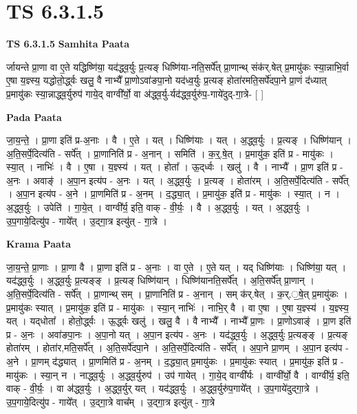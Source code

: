 \documentclass[17pt]{extarticle}
\begin{document}
\section{ TS 6.3.1.5 }

\textbf{TS 6.3.1.5 } \newline
\textbf{Samhita Paata} \newline

र्जायन्ते प्रा॒णा वा ए॒ते यद्धिष्णि॑या॒ यद॑द्ध्व॒र्युः प्र॒त्यङ् धिष्णि॑या-नति॒सर्पे᳚त् प्रा॒णान्थ् संक॑र्.षेत् प्र॒मायु॑कः स्या॒न्नाभि॒र्वा ए॒षा य॒ज्ञ्स्य॒ यद्धोतो॒र्द्ध्वः खलु॒ वै नाभ्यै᳚ प्रा॒णोऽवा॑ङपा॒नो यद॑ध्व॒र्युः प्र॒त्यङ् होता॑रमति॒सर्पे॑दपा॒ने प्रा॒णं द॑ध्यात् प्र॒मायु॑कः स्या॒न्नाद्ध्व॒र्युरुप॑ गाये॒द् वाग्वी᳚र्यो॒ वा अ॑द्ध्व॒र्यु-र्यद॑द्ध्व॒र्युरु॑प॒-गाये॑दुद्-गा॒त्रे- [  ] \newline

\textbf{Pada Paata} \newline

जा॒य॒न्ते॒ । प्रा॒णा इति॑ प्र-अ॒नाः । वै । ए॒ते । यत् । धिष्णि॑याः । यत् । अ॒द्ध्व॒र्युः । प्र॒त्यङ् । धिष्णि॑यान् । अ॒ति॒सर्पे॒दित्य॑ति - सर्पे᳚त् । प्रा॒णानिति॑ प्र - अ॒नान् । समिति॑ । क॒र्॒.षे॒त् । प्र॒मायु॑क॒ इति॑ प्र - मायु॑कः । स्या॒त् । नाभिः॑ । वै । ए॒षा । य॒ज्ञ्स्य॑ । यत् । होता᳚ । ऊ॒द्‌र्ध्वः । खलु॑ । वै । नाभ्यै᳚ । प्रा॒ण इति॑ प्र - अ॒नः । अवाङ्॑ । अ॒पा॒न इत्य॑प - अ॒नः । यत् । अ॒द्ध्व॒र्युः । प्र॒त्यङ् । होता॑रम् । अ॒ति॒सर्पे॒दित्य॑ति - सर्पे᳚त् । अ॒पा॒न इत्य॑प - अ॒ने । प्रा॒णमिति॑ प्र - अ॒नम् । द॒द्ध्या॒त् । प्र॒मायु॑क॒ इति॑ प्र - मायु॑कः । स्या॒त् । न । अ॒द्ध्व॒र्युः । उपेति॑ । गा॒ये॒त् । वाग्वी᳚र्य॒ इति॒ वाक् - वी॒र्यः॒ । वै । अ॒द्ध्व॒र्युः । यत् । अ॒द्ध्व॒र्युः । उ॒प॒गाये॒दित्यु॑प - गाये᳚त् । उ॒द्गा॒त्र इत्यु॑त् - गा॒त्रे ।  \newline


\textbf{Krama Paata} \newline

जा॒य॒न्ते॒ प्रा॒णाः । प्रा॒णा वै । प्रा॒णा इति॑ प्र - अ॒नाः । वा ए॒ते । ए॒ते यत् । यद् धिष्णि॑याः । धिष्णि॑या॒ यत् । यद॑द्ध्व॒र्युः । अ॒द्ध्व॒र्युः प्र॒त्यङ्‍ङ् । प्र॒त्यङ् धिष्णि॑यान् । धिष्णि॑यानति॒सर्पे᳚त् । अ॒ति॒सर्पे᳚त् प्रा॒णान् । अ॒ति॒सर्पे॒दित्य॑ति - सर्पे᳚त् । प्रा॒णान्थ् सम् । प्रा॒णानिति॑ प्र - अ॒नान् । सम् क॑र्.षेत् । क॒र्.॒षे॒त् प्र॒मायु॑कः । प्र॒मायु॑कः स्यात् । प्र॒मायु॑क॒ इति॑ प्र - मायु॑कः । स्या॒न् नाभिः॑ । नाभि॒र् वै । वा ए॒षा । ए॒षा य॒ज्ञ्स्य॑ । य॒ज्ञ्स्य॒ यत् । यद्‌धोता᳚ । होतो॒र्द्ध्वः । ऊ॒र्द्ध्वः खलु॑ । खलु॒ वै । वै नाभ्यै᳚ । नाभ्यै᳚ प्रा॒णः । प्रा॒णोऽवाङ्॑ । प्रा॒ण इति॑ प्र - अ॒नः । अवा॑ङपा॒नः । अ॒पा॒नो यत् । अ॒पा॒न इत्य॑प - अ॒नः । यद॑द्ध्व॒र्युः । अ॒द्ध्व॒र्युः प्र॒त्यङ्‍ङ् । प्र॒त्यङ् होता॑रम् । होता॑र,मति॒सर्पे᳚त् । अ॒ति॒सर्पे॑दपा॒ने । अ॒ति॒सर्पे॒दित्य॑ति - सर्पे᳚त् । अ॒पा॒ने प्रा॒णम् । अ॒पा॒न इत्य॑प - अ॒ने । प्रा॒णम् द॑द्ध्यात् । प्रा॒णमिति॑ प्र - अ॒नम् । द॒द्ध्या॒त् प्र॒मायु॑कः । प्र॒मायु॑कः स्यात् । प्र॒मायु॑क॒ इति॑ प्र - मायु॑कः । स्या॒न् न । नाद्ध्व॒र्युः । अ॒द्ध्व॒र्युरुप॑ । उप॑ गायेत् । गा॒ये॒द् वाग्वी᳚र्यः । वाग्वी᳚र्यो॒ वै । वाग्वी᳚र्य॒ इति॒ वाक् - वी॒र्यः॒ । वा अ॑द्ध्व॒र्युः । अ॒द्ध्व॒र्युर् यत् । यद॑द्ध्व॒र्युः । अ॒द्ध्व॒र्युरु॑प॒गाये᳚त् । उ॒प॒गाये॑दुद्‍गा॒त्रे । उ॒प॒गाये॒दित्यु॑प - गाये᳚त् । उ॒द्‍गा॒त्रे वाच᳚म् । उ॒द्‍गा॒त्र इत्यु॑त् - गा॒त्रे \newline
\end{document}

